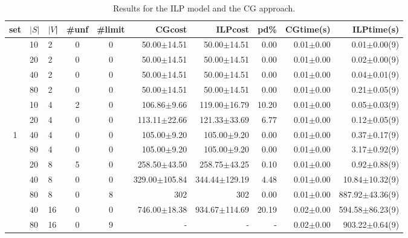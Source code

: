 \documentclass[conference]{IEEEtran}
\begin{document}
\begin{table*}[h]
\begin{center}
  \caption{Results for the ILP model and the CG approach. \label{tab:com1}}
  \begin{tabular}{c l l| c c r r r r r}
set &$|S|$ & $|V$| &  \#unf & \#limit & CGcost           &   ILPcost   &  pd\%   &  CGtime(s)        &  ILPtime(s)    \\
\hline
&10 & 2    & 0 & 0 &  50.00$\pm$14.51       &  50.00$\pm$14.51    &   0.00     &  0.01$\pm$0.00   &  0.01$\pm$0.00(9)        \\
&20 & 2    & 0 & 0 &  50.00$\pm$14.51       &  50.00$\pm$14.51    &   0.00     &  0.01$\pm$0.00   &  0.02$\pm$0.00(9)        \\
&40 & 2    & 0 & 0 &  50.00$\pm$14.51       &  50.00$\pm$14.51    &   0.00     &  0.01$\pm$0.00   &  0.04$\pm$0.01(9)        \\
&80 & 2    & 0 & 0 &  50.00$\pm$14.51       &  50.00$\pm$14.51    &   0.00     &  0.01$\pm$0.00   &  0.21$\pm$0.05(9)        \\
&10 & 4    & 2 & 0 &  106.86$\pm$9.66       &  119.00$\pm$16.79   &   10.20    &  0.01$\pm$0.00   &  0.05$\pm$0.03(9)        \\
&20 & 4    & 0 & 0 &  113.11$\pm$22.66      &  121.33$\pm$33.69   &   6.77     &  0.01$\pm$0.00   &  0.12$\pm$0.05(9)        \\
1&40 & 4   & 0 & 0 &  105.00$\pm$9.20       &  105.00$\pm$9.20     &  0.00     &  0.01$\pm$0.00   &  0.37$\pm$0.17(9)        \\
&80 & 4    & 0 & 0 &  105.00$\pm$9.20       &  105.00$\pm$9.20    &   0.00     &  0.01$\pm$0.00   &  3.17$\pm$0.92(9)        \\
&20 & 8    & 5 & 0 &  258.50$\pm$43.50      &  258.75$\pm$43.25   &   0.10     &  0.01$\pm$0.00   &  0.92$\pm$0.88(9)        \\
&40 & 8    & 0 & 0 &  329.00$\pm$105.84     &  344.44$\pm$129.19  &   4.48     &  0.01$\pm$0.00   &  10.84$\pm$10.32(9)      \\
&80 & 8    & 0 & 8 &  302                   &  302                &   0.00     &  0.01$\pm$0.00   &  887.92$\pm$43.36(9)     \\
&40 & 16   & 0 & 0 &  746.00$\pm$18.38      &  934.67$\pm$114.69  &   20.19    &  0.02$\pm$0.00   &  594.58$\pm$86.23(9)    \\
&80 & 16   & 0 & 9 &  -                     &  -                  &   -        &  0.02$\pm$0.00   &  903.22$\pm$0.64(9)      \\

\end{tabular}
\end{center}
\end{table*}
\end{document}
